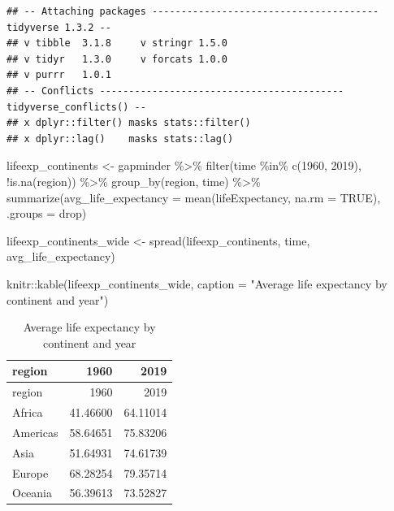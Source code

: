 \documentclass[
]{article}
\newenvironment{Shaded}{\begin{snugshade}}{\end{snugshade}}
\newcommand{\AttributeTok}[1]{\textcolor[rgb]{0.77,0.63,0.00}{#1}}
\newcommand{\ConstantTok}[1]{\textcolor[rgb]{0.00,0.00,0.00}{#1}}
\newcommand{\DecValTok}[1]{\textcolor[rgb]{0.00,0.00,0.81}{#1}}
\newcommand{\FunctionTok}[1]{\textcolor[rgb]{0.00,0.00,0.00}{#1}}
\newcommand{\NormalTok}[1]{#1}
\newcommand{\OtherTok}[1]{\textcolor[rgb]{0.56,0.35,0.01}{#1}}
\newcommand{\SpecialCharTok}[1]{\textcolor[rgb]{0.00,0.00,0.00}{#1}}
\newcommand{\StringTok}[1]{\textcolor[rgb]{0.31,0.60,0.02}{#1}}
\begin{document}
\begin{verbatim}
## -- Attaching packages --------------------------------------- tidyverse 1.3.2 --
## v tibble  3.1.8     v stringr 1.5.0
## v tidyr   1.3.0     v forcats 1.0.0
## v purrr   1.0.1     
## -- Conflicts ------------------------------------------ tidyverse_conflicts() --
## x dplyr::filter() masks stats::filter()
## x dplyr::lag()    masks stats::lag()
\end{verbatim}

\begin{Shaded}
\begin{Highlighting}[]
\NormalTok{lifeexp\_continents }\OtherTok{\textless{}{-}}\NormalTok{ gapminder }\SpecialCharTok{\%\textgreater{}\%} 
  \FunctionTok{filter}\NormalTok{(time }\SpecialCharTok{\%in\%} \FunctionTok{c}\NormalTok{(}\DecValTok{1960}\NormalTok{, }\DecValTok{2019}\NormalTok{), }\SpecialCharTok{!}\FunctionTok{is.na}\NormalTok{(region)) }\SpecialCharTok{\%\textgreater{}\%} 
  \FunctionTok{group\_by}\NormalTok{(region, time) }\SpecialCharTok{\%\textgreater{}\%} 
  \FunctionTok{summarize}\NormalTok{(}\AttributeTok{avg\_life\_expectancy =} \FunctionTok{mean}\NormalTok{(lifeExpectancy, }\AttributeTok{na.rm =} \ConstantTok{TRUE}\NormalTok{), }\AttributeTok{.groups =} \StringTok{\textquotesingle{}drop\textquotesingle{}}\NormalTok{)}

\NormalTok{lifeexp\_continents\_wide }\OtherTok{\textless{}{-}} \FunctionTok{spread}\NormalTok{(lifeexp\_continents, time, avg\_life\_expectancy)}

\NormalTok{knitr}\SpecialCharTok{::}\FunctionTok{kable}\NormalTok{(lifeexp\_continents\_wide, }\AttributeTok{caption =} \StringTok{"Average life expectancy by continent and year"}\NormalTok{)}
\end{Highlighting}
\end{Shaded}

\begin{longtable}[]{@{}lrr@{}}
\caption{Average life expectancy by continent and year}\tabularnewline
\toprule()
region & 1960 & 2019 \\
\midrule()
\endfirsthead
\toprule()
region & 1960 & 2019 \\
\midrule()
\endhead
Africa & 41.46600 & 64.11014 \\
Americas & 58.64651 & 75.83206 \\
Asia & 51.64931 & 74.61739 \\
Europe & 68.28254 & 79.35714 \\
Oceania & 56.39613 & 73.52827 \\
\bottomrule()
\end{longtable}
\end{document}
